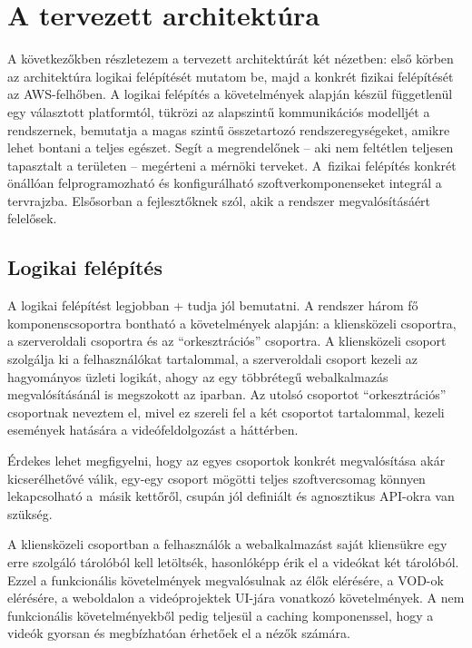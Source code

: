 \chapter{A tervezett architektúra}

A következőkben részletezem a tervezett architektúrát két nézetben: első körben az architektúra logikai felépítését mutatom be, majd a konkrét fizikai felépítését az AWS-felhőben. A logikai felépítés a követelmények alapján készül függetlenül egy választott platformtól, tükrözi az alapszintű kommunikációs modelljét a rendszernek, bemutatja a magas szintű összetartozó rendszeregységeket, amikre lehet bontani a teljes egészet. Segít a megrendelőnek -- aki nem feltétlen teljesen tapasztalt a területen -- megérteni a mérnöki terveket. A~fizikai felépítés konkrét önállóan felprogramozható és konfigurálható szoftverkomponenseket integrál a tervrajzba. Elsősorban a fejlesztőknek szól, akik a rendszer megvalósításáért felelősek.

\section{Logikai felépítés}

A logikai felépítést legjobban \az+ tudja jól bemutatni. A rendszer három fő komponenscsoportra bontható a követelmények alapján: a kliensközeli csoportra, a szerveroldali csoportra és az ``orkesztrációs'' csoportra. A kliensközeli csoport szolgálja ki a felhasználókat tartalommal, a szerveroldali csoport kezeli az hagyományos üzleti logikát, ahogy az egy többrétegű webalkalmazás megvalósításánál is megszokott az iparban. Az utolsó csoportot ``orkesztrációs'' csoportnak neveztem el, mivel ez szereli fel a két csoportot tartalommal, kezeli események hatására a videófeldolgozást a háttérben.

Érdekes lehet megfigyelni, hogy az egyes csoportok konkrét megvalósítása akár kicserélhetővé válik, egy-egy csoport mögötti teljes szoftvercsomag könnyen lekapcsolható a~másik kettőről, csupán jól definiált és agnosztikus API-okra van szükség.

A kliensközeli csoportban a felhasználók a webalkalmazást saját kliensükre egy erre szolgáló tárolóból kell letöltsék, hasonlóképp érik el a videókat két tárolóból. Ezzel a funkcionális követelmények megvalósulnak az élők elérésére, a VOD-ok elérésére, a weboldalon a videóprojektek UI-jára vonatkozó követelmények. A nem funkcionális követelményekből pedig teljesül a caching komponenssel, hogy a videók gyorsan és megbízhatóan érhetőek el a nézők számára.


